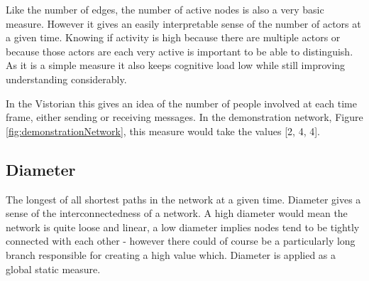 Like the number of edges, the number of active nodes is also a very basic measure. However it gives an easily interpretable sense of the number of actors at a given time. Knowing if activity is high because there are multiple actors or because those actors are each very active is important to be able to distinguish. As it is a simple measure it also keeps cognitive load low while still improving understanding considerably.

In the Vistorian this gives an idea of the number of people involved at each time frame, either sending or receiving messages. 
In the demonstration network, Figure \ref{fig:demonstrationNetwork}, this measure would take the values [2, 4, 4]. 


\subsection{Diameter}
The longest of all shortest paths in the network at a given time. Diameter gives a sense of the interconnectedness of a network. A high diameter would mean the network is quite loose and linear, a low diameter implies nodes tend to be tightly connected with each other - however there could of course be a particularly long branch responsible for creating a high value which. Diameter is applied as a global static measure.

